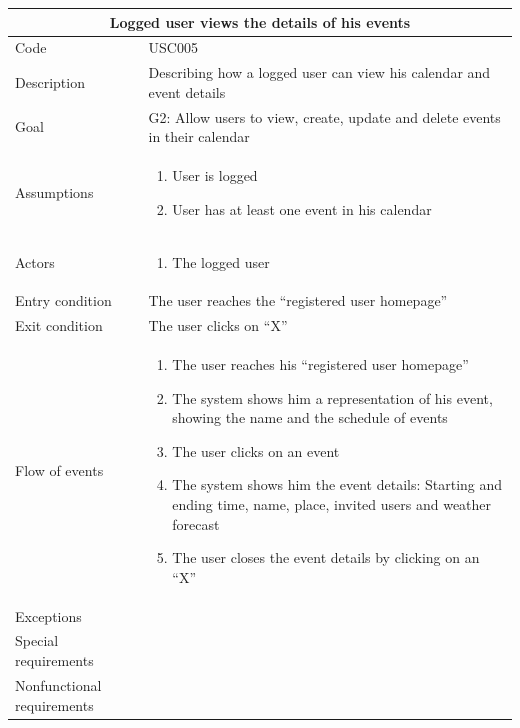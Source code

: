 \documentclass[10pt,a4paper,titlepage]{article}
\begin{document}
\begin{tabular}[h]{| p{3cm} | p{10cm} |}
\hline \multicolumn{2}{|c|}{\textbf{ Logged user views the details of his events }} \\ 
\hline Code & USC005 \\ 
\hline Description & Describing how a logged user can view his calendar and event details\\
\hline Goal & G2: Allow users to view, create, update and delete events in their calendar\\
\hline Assumptions  & \begin{enumerate}
\item User is logged
\item User has at least one event in his calendar
\end{enumerate} \\
\hline Actors &  \begin{enumerate}
\item The logged user
\end{enumerate} \\
\hline Entry condition & The user reaches the “registered user homepage” \\
\hline Exit condition & The user clicks on “X” \\
\hline Flow of events & \begin{enumerate}
\item The user reaches his “registered user homepage”
\item The system shows him a representation of his event, showing the name and the schedule of events
\item The user clicks on an event
\item The system shows him the event details: Starting and ending time, name, place, invited users and weather forecast
\item The user closes the event details by clicking on an “X”
\end{enumerate}\\
\hline Exceptions & \\
\hline Special requirements & \\
\hline Nonfunctional requirements & \\
\hline
\end{tabular}
\end{document}
